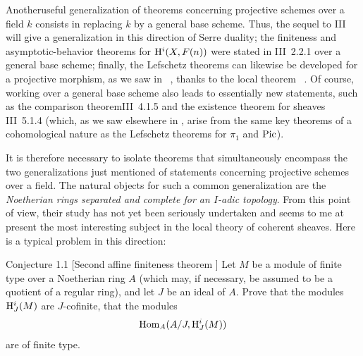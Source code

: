 Another\pageoriginale useful generalization of theorems concerning projective schemes over a field $k$ consists in replacing $k$ by a general base scheme. Thus, the sequel to {\EGA III} will give a generalization in this direction of Serre duality; the finiteness and asymptotic-behavior theorems for $\mathrm H^i(X, F(n))$ were stated in \EGA III~2.2.1 over a general base scheme; finally, the Lefschetz theorems can likewise be developed for a projective morphism, as we saw in ~, thanks to the local theorem ~. Of course, working over a general base scheme also leads to essentially new statements, such as the \og comparison theorem\fg \EGA III~4.1.5 and the existence theorem for sheaves \EGA III~5.1.4 (which, as we saw elsewhere in , arise from the same key theorems of a cohomological nature as the Lefschetz theorems for $\pi_1$ and $\operatorname{Pic}$).

It is therefore necessary to isolate theorems that simultaneously encompass the two generalizations just mentioned of statements concerning projective schemes over a field. The natural objects for such a common generalization are the \emph{Noetherian rings separated and complete for an $I$-adic topology}. From this point of view, their study has not yet been seriously undertaken and seems to me at present the most interesting subject in the local theory of coherent sheaves. Here is a typical problem in this direction:

\label{XIII.1.1}
\begin{enonce*}{Conjecture 1.1}
 [\og Second affine finiteness theorem\fg
  ]
Let $M$ be a module of finite type over a Noetherian ring $A$ (which may, if necessary, be assumed to be a quotient of a regular ring), and let $J$ be an ideal of $A$. Prove that the modules $\mathrm H^i_J(M)$ are \og $J$-cofinite\fg, \ie that the modules
$$
\operatorname{Hom}_A(A/J, \mathrm H^i_J(M))$$
are of finite type.
\end{enonce*}

